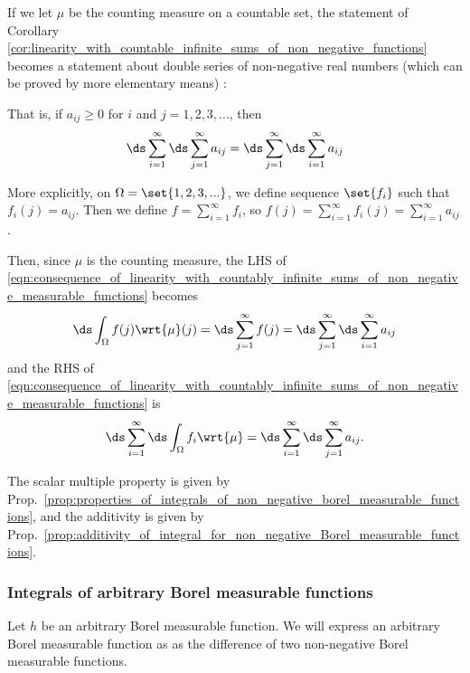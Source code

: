 \documentclass{article} %
\newcommand{\dint}{\ds\int}
\newcommand{\dsum}{\ds\sum}
\newcommand{\dmu}{\wrt{\mu}}
\begin{document}
\begin{remark}
If we let $\mu$ be the counting measure on a countable set, the statement of  Corollary \ref{cor:linearity_with_countable_infinite_sums_of_non_negative_functions} becomes a statement about double series of non-negative real numbers (which can be proved by more elementary means) \cite{rudin1987real}:

That is, if $a_{ij} \geq 0$ for $i$ and $j = 1, 2, 3, ...$, then 
\[ \ds\sum_{i=1}^\infty \ds\sum_{j=1}^\infty  a_{ij} = \ds\sum_{j=1}^\infty \ds\sum_{i=1}^\infty  a_{ij} \]

{\tiny More explicitly, on $\Omega =\set{1,2,3,...}$, we define sequence $\set{f_i}$ such that $f_i(j) = a_{ij}$.  Then we define $f = \sum_{i=1}^\infty f_i$, so $f(j) = \sum_{i=1}^\infty f_i(j) = \sum_{i=1}^\infty a_{ij}$.

Then, since $\mu$ is the counting measure, the LHS of  \eqref{eqn:consequence_of_linearity_with_countably_infinite_sums_of_non_negative_measurable_functions} becomes 
\[  \dint_\Omega f(j) \dmu(j) = \dsum_{j=1}^\infty f(j) = \ds\sum_{j=1}^\infty \ds\sum_{i=1}^\infty a_{ij}\]	
and the RHS of \eqref{eqn:consequence_of_linearity_with_countably_infinite_sums_of_non_negative_measurable_functions} is 
\[ \ds\sum_{i=1}^\infty \ds\int_\Omega f_i \dmu = \ds\sum_{i=1}^\infty \ds\sum_{j=1}^\infty a_{ij}. \]
}

\end{remark}


\begin{remark}{} The scalar multiple property is given by Prop.~\ref{prop:properties_of_integrals_of_non_negative_borel_measurable_functions}, and the additivity is given by Prop.~\ref{prop:additivity_of_integral_for_non_negative_Borel_measurable_functions}.
\label{rk:integrals_are_linear_over_non_negative_Borel_measurable_function}
\end{remark}



\subsubsection{Integrals of arbitrary Borel measurable functions}

Let $h$ be an arbitrary Borel measurable function.   We will express an arbitrary Borel measurable function as as the difference of two non-negative Borel measurable functions.
\end{document}

